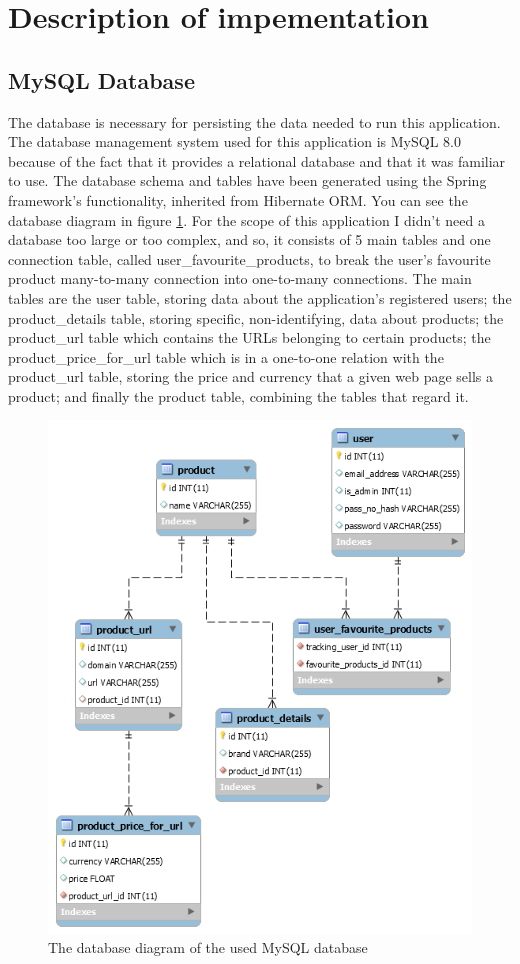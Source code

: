 \documentclass[12pt,a4paper,twoside]{report}
\begin{document}
\section{Description of impementation}

\subsection{MySQL Database}

The database is necessary for persisting the data needed to run this application. The database management system used for this application is MySQL 8.0 because of the fact that it provides a relational database and that it was familiar to use. The database schema and tables have been generated using the Spring framework's functionality, inherited from Hibernate ORM. You can see the database diagram in figure \ref{fig:database_diagram}. For the scope of this application I didn't need a database too large or too complex, and so, it consists of 5 main tables and one connection table, called user\_favourite\_products, to break the user's favourite product many-to-many connection into one-to-many connections. The main tables are the user table, storing data about the application's registered users; the product\_details table, storing specific, non-identifying, data about products; the product\_url table which contains the URLs belonging to certain products; the product\_price\_for\_url table which is in a one-to-one relation with the product\_url table, storing the price and currency that a given web page sells a product; and finally the product table, combining the tables that regard it.

\begin{figure}[ht]
  \centering
  \includegraphics[width=0.65\linewidth]{img/database_diagram.png}
  \caption[]{The database diagram of the used MySQL database}
  \label{fig:database_diagram}
\end{figure}
\end{document}
